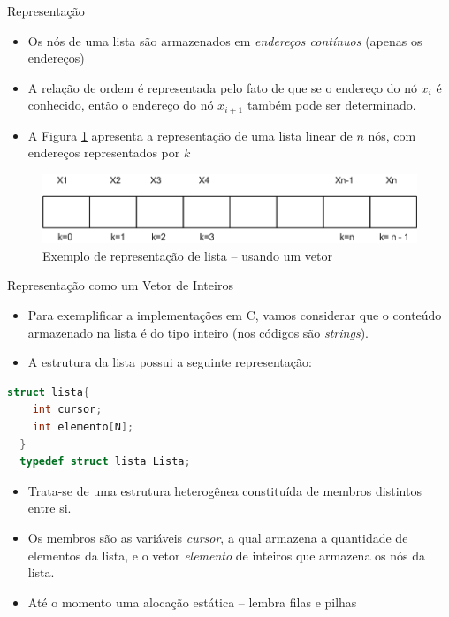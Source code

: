 \begin{frame}{Representação}
\begin{itemize}
	\item Os nós de uma lista são armazenados em {\it endereços contínuos} (apenas os endereços)
	\item A relação de ordem é representada pelo fato de que se o endereço do 
	nó $x_i$ é conhecido, então o endereço do nó $x_{i+1}$ também pode ser determinado. 	
	\item A Figura \ref{fig:lista-linear-repre} apresenta a representação de
	 uma lista linear de $n$ nós, com endereços representados por $k$
\end{itemize}

\begin{figure}[hb]
	\centering
		\includegraphics[width=.6\textwidth]{figs/fig_listas/lista-linear.png}			
			\caption{Exemplo de representação de lista -- usando um vetor}	
				\label{fig:lista-linear-repre}
			\end{figure} 
\end{frame}
\begin{frame}[fragile,c]{Representação como um Vetor de Inteiros}
\begin{itemize}
	\item Para exemplificar a implementações em C, vamos considerar que 
	o conteúdo armazenado na lista é do tipo inteiro (nos códigos são {\it strings}).
	\item A estrutura da lista possui a seguinte representação:	
\end{itemize}
\begin{lstlisting}[language=C]
  struct lista{
    int cursor;
    int elemento[N];
  }
  typedef struct lista Lista;
\end{lstlisting}

\begin{itemize}
	\item Trata-se de uma estrutura heterogênea constituída de membros distintos entre si. 
	\item Os membros são as variáveis \alert{\textit{cursor}}, a qual  armazena a  	quantidade de elementos da lista, e o vetor \alert{\textit{elemento}} de inteiros 	que armazena os nós da lista.
	\item Até o momento uma alocação estática -- lembra filas e pilhas
\end{itemize}
\end{frame}

